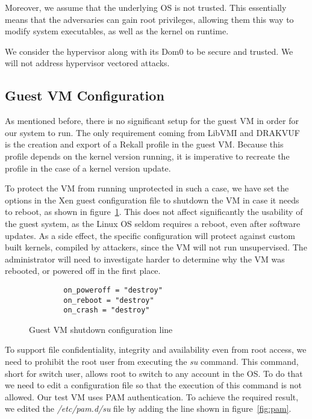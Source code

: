 \par Moreover, we assume that the underlying \ac{OS} is not trusted. This essentially means that the adversaries can gain root privileges, allowing them this way to modify system executables, as well as the kernel on runtime.

\par We consider the hypervisor along with its Dom0 to be secure and trusted. We will not address hypervisor vectored attacks.

\subsection{Guest \ac{VM} Configuration}\label{sub:conf}

As mentioned before, there is no significant setup for the guest \ac{VM} in order for our system to run. The only requirement coming from LibVMI and DRAKVUF is the creation and export of a Rekall profile in the guest \ac{VM}. Because this profile depends on the kernel version running, it is imperative to recreate the profile in the case of a kernel version update. 
\par To protect the \ac{VM} from running unprotected in such a case, we have set the options in the Xen guest configuration file to shutdown the \ac{VM} in case it needs to reboot, as shown in figure~\ref{fig:conf}. This does not affect significantly the usability of the guest system, as the Linux \ac{OS} seldom requires a reboot, even after software updates. As a side effect, the specific configuration will protect against custom built kernels, compiled by attackers, since the \ac{VM} will not run unsupervised. The administrator will need to investigate harder to determine why the \ac{VM} was rebooted, or powered off in the first place.

\begin{figure}[ht]
	\centering
	\begin{lstlisting}
		on_poweroff = "destroy"
		on_reboot = "destroy"
		on_crash = "destroy"
	\end{lstlisting}
	\caption{Guest \ac{VM} shutdown configuration line}
	\label{fig:conf}
\end{figure}

\par To support file confidentiality, integrity and availability even from root access, we need to prohibit the root user from executing the \textit{su} command. This command, short for switch user, allows root to switch to any account in the \ac{OS}. To do that we need to edit a configuration file so that the execution of this command is not allowed. Our test \ac{VM} uses \ac{PAM} authentication. To achieve the required result, we edited the \textit{/etc/pam.d/su} file by adding the line shown in figure~\ref{fig:pam}.

